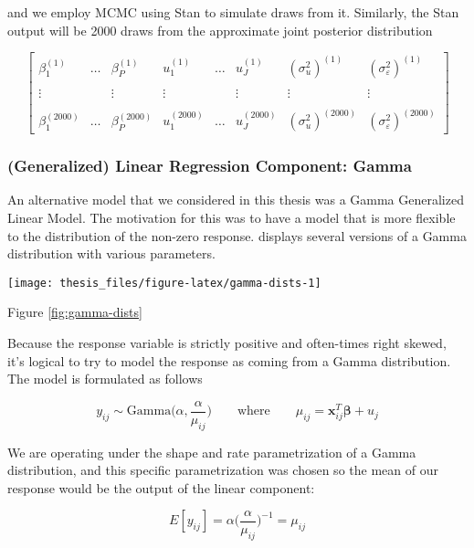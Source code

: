 \documentclass[12pt,twoside]{reedthesis}
\begin{document}
and we employ MCMC using Stan to simulate draws from it. Similarly, the Stan output will be 2000 draws from the approximate joint posterior distribution

\[
\begin{bmatrix}
  \beta_1^{(1)} & \dots & \beta_P^{(1)} & u_1^{(1)} & \dots & u_J^{(1)} & (\sigma_u^2)^{(1)} & (\sigma_{\varepsilon}^2)^{(1)} \\
  \\ \vdots &  & \vdots & \vdots & & \vdots & \vdots & \vdots \\ \\
  \beta_1^{(2000)} & \dots & \beta_P^{(2000)} & u_1^{(2000)} & \dots & u_J^{(2000)} & (\sigma_u^2)^{(2000)} & (\sigma_{\varepsilon}^2)^{(2000)}
\end{bmatrix}
\]

\hypertarget{generalized-linear-regression-component-gamma}{%
\subsubsection{(Generalized) Linear Regression Component: Gamma}\label{generalized-linear-regression-component-gamma}}

An alternative model that we considered in this thesis was a Gamma Generalized Linear Model. The motivation for this was to have a model that is more flexible to the distribution of the non-zero response. displays several versions of a Gamma distribution with various parameters.
\begin{center}\texttt{[image: thesis\_files/figure-latex/gamma-dists-1]} \end{center}

Figure \ref{fig:gamma-dists}

Because the response variable is strictly positive and often-times right skewed, it's logical to try to model the response as coming from a Gamma distribution. The model is formulated as follows

\[
y_{ij} \sim \text{Gamma}\bigg(\alpha, \frac{\alpha}{\mu_{ij}}\bigg) \qquad \text{where} \qquad \mu_{ij} = \mathbf{x}_{ij}^T\boldsymbol{\beta} + u_j
\]

We are operating under the shape and rate parametrization of a Gamma distribution, and this specific parametrization was chosen so the mean of our response would be the output of the linear component:

\[
E[y_{ij}] = \alpha \bigg(\frac{\alpha}{\mu_{ij}}\bigg)^{-1} = \mu_{ij}
\]
\end{document}
